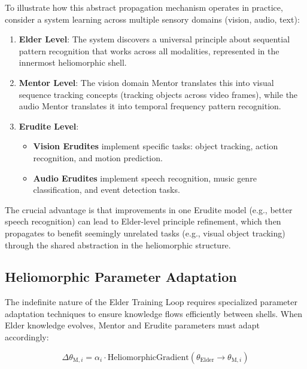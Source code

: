 To illustrate how this abstract propagation mechanism operates in practice, consider a system learning across multiple sensory domains (vision, audio, text):

\begin{enumerate}
    \item \textbf{Elder Level}: The system discovers a universal principle about sequential pattern recognition that works across all modalities, represented in the innermost heliomorphic shell.
    
    \item \textbf{Mentor Level}: The vision domain Mentor translates this into visual sequence tracking concepts (tracking objects across video frames), while the audio Mentor translates it into temporal frequency pattern recognition.
    
    \item \textbf{Erudite Level}: 
        \begin{itemize}
            \item \textbf{Vision Erudites} implement specific tasks: object tracking, action recognition, and motion prediction.
            \item \textbf{Audio Erudites} implement speech recognition, music genre classification, and event detection tasks.
        \end{itemize}
\end{enumerate}

The crucial advantage is that improvements in one Erudite model (e.g., better speech recognition) can lead to Elder-level principle refinement, which then propagates to benefit seemingly unrelated tasks (e.g., visual object tracking) through the shared abstraction in the heliomorphic structure.

\subsection{Heliomorphic Parameter Adaptation}

The indefinite nature of the Elder Training Loop requires specialized parameter adaptation techniques to ensure knowledge flows efficiently between shells. When Elder knowledge evolves, Mentor and Erudite parameters must adapt accordingly:

\begin{equation}
\Delta \theta_{\text{M},i} = \alpha_i \cdot \text{HeliomorphicGradient}(\theta_{\text{Elder}} \rightarrow \theta_{\text{M},i})
\end{equation}


